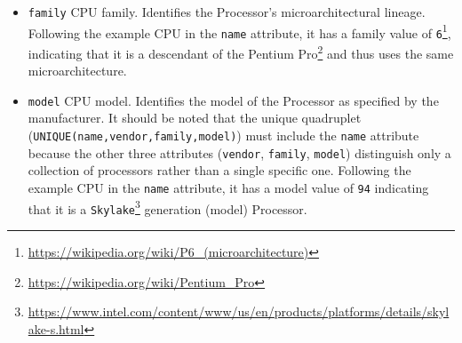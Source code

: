 \begin{itemize}
\begin{itemize}
      \item \texttt{INTEL}
        \newline
        Intel Corporation.

      \item \texttt{UNKNOWN}
        \newline
        Identifies an unknown manufacturer.
    \end{itemize}
    Due to historical reasons, the original manufacturer identifier string value
    read from \texttt{/proc/cpuinfo} is slightly different\footnote{\url{https://wikipedia.org/wiki/CPUID}}:
    \texttt{INTEL} is \texttt{GenuineIntel} and \texttt{AMD} is \texttt{AuthenticAMD}.
    They have been changed/standardized to be more easily identified, with a shorter
    name as well.

  \item \texttt{family}
    \newline
    CPU family.
    \newline
    Identifies the Processor's microarchitectural lineage.
    \newline
    Following the example CPU in the \texttt{name} attribute, it has a family
    value of \texttt{6}\footnote{\url{https://wikipedia.org/wiki/P6_(microarchitecture)}},
    indicating that it is a descendant of the Pentium Pro\footnote{\url{https://wikipedia.org/wiki/Pentium_Pro}}
    and thus uses the same microarchitecture.

  \item \texttt{model}
    \newline
    CPU model.
    \newline
    Identifies the model of the Processor as specified by the manufacturer.
    \newline
    It should be noted that the unique quadruplet (\texttt{UNIQUE(name,vendor,family,model)})
    must include the \texttt{name} attribute because the other three attributes (\texttt{vendor},
    \texttt{family}, \texttt{model}) distinguish only a collection of processors
    rather than a single specific one.
    \newline
    Following the example CPU in the \texttt{name} attribute, it has a model value
    of \texttt{94} indicating that it is a \texttt{Skylake}\footnote{\url{https://www.intel.com/content/www/us/en/products/platforms/details/skylake-s.html}}
    generation (model) Processor.


\end{itemize}
